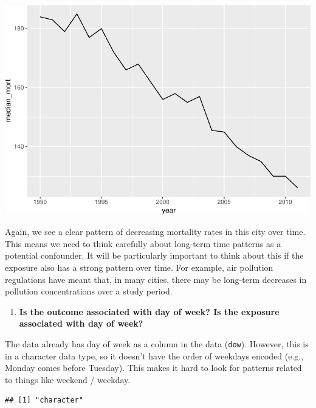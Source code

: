 \documentclass[
]{book}
\newenvironment{Shaded}{\begin{snugshade}}{\end{snugshade}}
\newcommand{\FunctionTok}[1]{\textcolor[rgb]{0.00,0.00,0.00}{#1}}
\newcommand{\NormalTok}[1]{#1}
\newcommand{\SpecialCharTok}[1]{\textcolor[rgb]{0.00,0.00,0.00}{#1}}
\providecommand{\tightlist}{%
  \setlength{\itemsep}{0pt}\setlength{\parskip}{0pt}}
\begin{document}
\includegraphics{adv_epi_analysis_files/figure-latex/unnamed-chunk-16-1.pdf}

Again, we see a clear pattern of decreasing mortality rates in this city over time.
This means we need to think carefully about long-term time patterns as a potential
confounder. It will be particularly important to think about this if the exposure
also has a strong pattern over time. For example, air pollution regulations have
meant that, in many cities, there may be long-term decreases in pollution
concentrations over a study period.

\begin{enumerate}
\def\labelenumi{\arabic{enumi}.}
\setcounter{enumi}{4}
\tightlist
\item
  \textbf{Is the outcome associated with day of week? Is the exposure associated
  with day of week?}
\end{enumerate}

The data already has day of week as a column in the data (\texttt{dow}). However,
this is in a character data type, so it doesn't have the order of weekdays
encoded (e.g., Monday comes before Tuesday). This makes it hard to look for
patterns related to things like weekend / weekday.

\begin{Shaded}
\end{Shaded}

\begin{verbatim}
## [1] "character"
\end{verbatim}
\end{document}
